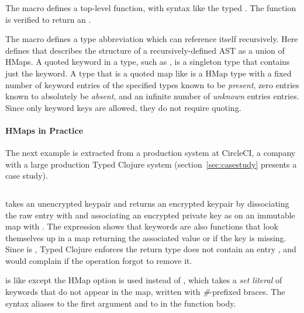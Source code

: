\begin{exmp}
\inputminted[firstline=6,lastline=13]{clojure}{code/demo/src/demo/hmap.clj}
\label{example:decleaf}
\end{exmp}

The  macro defines a top-level function, with syntax like the typed .
The function  is verified to return an .

The  macro defines a type abbreviation which can reference itself recursively.
Here  defines 
that describes the structure of a recursively-defined AST as a union of HMaps.
A quoted keyword in a type, such as , is a singleton type that contains just the keyword.
A type that is a quoted map like  is a
HMap type with a fixed number of keyword entries of the specified types
known to be \emph{present},
zero entries known to absolutely be \emph{absent},
and an infinite number of \emph{unknown} entries entries.
Since only keyword keys are allowed, they do not require quoting.

\paragraph{HMaps in Practice} The next example is extracted from a production system at CircleCI,
a company with a large production Typed Clojure system
(section~\ref{sec:casestudy} presents a case study).

\begin{exmp}
\inputminted[firstline=10,lastline=22]{clojure}{code/demo/src/demo/key.clj}
\label{example:circleci}
\end{exmp}

 takes an unencrypted keypair and returns an encrypted keypair by
dissociating the raw  entry with 
and associating an encrypted private key
as  on an immutable map with .
The expression  shows that keywords are also 
functions that look themselves up in a map returning the associated value or \nil{} if the key is missing.
Since  is , Typed Clojure enforces the return type
does not contain an entry , and would complain if the 
operation forgot to remove it.

is like 
except the  HMap option is used
instead of ,
which takes a \emph{set literal} of keywords that do not appear in the map, written 
with \emph{\#}-prefixed braces.
The syntax 
aliases  to the first argument and  to 
in the function body.

